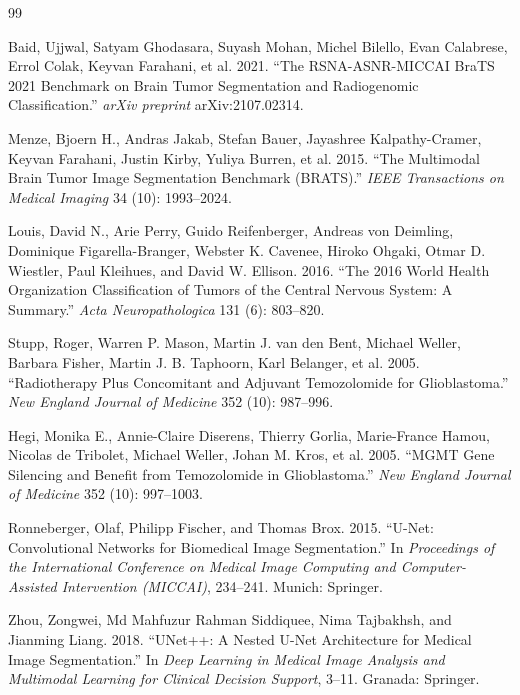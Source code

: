 \documentclass[conference]{IEEEtran}
\begin{document}
\begin{thebibliography}{99}

Baid, Ujjwal, Satyam Ghodasara, Suyash Mohan, Michel Bilello, Evan Calabrese, Errol Colak, Keyvan Farahani, et al. 2021. ``The RSNA-ASNR-MICCAI BraTS 2021 Benchmark on Brain Tumor Segmentation and Radiogenomic Classification.'' \textit{arXiv preprint} arXiv:2107.02314.

Menze, Bjoern H., Andras Jakab, Stefan Bauer, Jayashree Kalpathy-Cramer, Keyvan Farahani, Justin Kirby, Yuliya Burren, et al. 2015. ``The Multimodal Brain Tumor Image Segmentation Benchmark (BRATS).'' \textit{IEEE Transactions on Medical Imaging} 34 (10): 1993--2024.

Louis, David N., Arie Perry, Guido Reifenberger, Andreas von Deimling, Dominique Figarella-Branger, Webster K. Cavenee, Hiroko Ohgaki, Otmar D. Wiestler, Paul Kleihues, and David W. Ellison. 2016. ``The 2016 World Health Organization Classification of Tumors of the Central Nervous System: A Summary.'' \textit{Acta Neuropathologica} 131 (6): 803--820.

Stupp, Roger, Warren P. Mason, Martin J. van den Bent, Michael Weller, Barbara Fisher, Martin J. B. Taphoorn, Karl Belanger, et al. 2005. ``Radiotherapy Plus Concomitant and Adjuvant Temozolomide for Glioblastoma.'' \textit{New England Journal of Medicine} 352 (10): 987--996.

Hegi, Monika E., Annie-Claire Diserens, Thierry Gorlia, Marie-France Hamou, Nicolas de Tribolet, Michael Weller, Johan M. Kros, et al. 2005. ``MGMT Gene Silencing and Benefit from Temozolomide in Glioblastoma.'' \textit{New England Journal of Medicine} 352 (10): 997--1003.

Ronneberger, Olaf, Philipp Fischer, and Thomas Brox. 2015. ``U-Net: Convolutional Networks for Biomedical Image Segmentation.'' In \textit{Proceedings of the International Conference on Medical Image Computing and Computer-Assisted Intervention (MICCAI)}, 234--241. Munich: Springer.

Zhou, Zongwei, Md Mahfuzur Rahman Siddiquee, Nima Tajbakhsh, and Jianming Liang. 2018. ``UNet++: A Nested U-Net Architecture for Medical Image Segmentation.'' In \textit{Deep Learning in Medical Image Analysis and Multimodal Learning for Clinical Decision Support}, 3--11. Granada: Springer.


\end{thebibliography}
\end{document}
